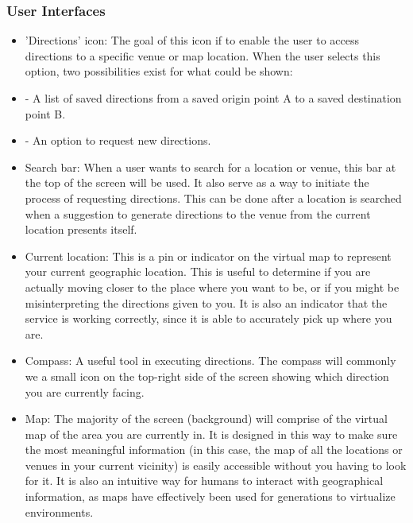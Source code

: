 \documentclass[runningheads,a4paper]{article}
\begin{document}
\subsubsection{User Interfaces}
\begin{itemize}

	\item 'Directions' icon: The goal of this icon if to enable the user to access directions to a specific venue or map location. When the user selects this option, two possibilities exist for what could be shown:
	
   	\item - A list of saved directions from a saved origin point A to a saved destination point B.
    	
   	\item - An option to request new directions.
	
	\item Search bar: When a user wants to search for a location or venue, this bar at the top of the screen will be used. It also serve as a way to initiate the process of requesting directions. This can be done after a location is searched when a suggestion to generate directions to the venue from the current location presents itself.
	
	\item Current location: This is a pin or indicator on the virtual map to represent your current geographic location. This is useful to determine if you are actually moving closer to the place where you want to be, or if you might be misinterpreting the directions given to you. It is also an indicator that the service is working correctly, since it is able to accurately pick up where you are.
	
	\item Compass: A useful tool in executing directions. The compass will commonly we a small icon on the top-right side of the screen showing which direction you are currently facing.
	
	\item Map: The majority of the screen (background) will comprise of the virtual map of the area you are currently in. It is designed in this way to make sure the most meaningful information (in this case, the map of all the locations or venues in your current vicinity) is easily accessible without you having to look for it. It is also an intuitive way for humans to interact with geographical information, as maps have effectively been used for generations to virtualize environments.
	

\end{itemize}
\end{document}
